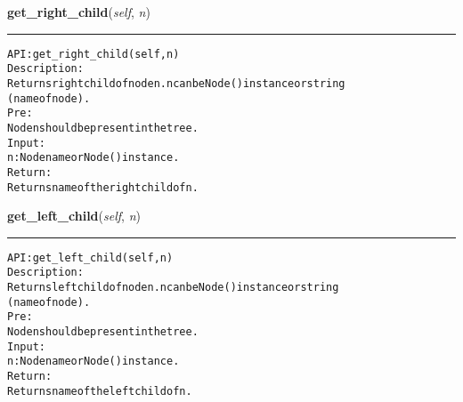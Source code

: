     \label{coinor:gimpy:tree:BinaryTree:get_right_child}

    \vspace{0.5ex}

\hspace{.8\funcindent}\begin{boxedminipage}{\funcwidth}

    \raggedright \textbf{get\_right\_child}(\textit{self}, \textit{n})

    \vspace{-1.5ex}

    \rule{\textwidth}{0.5\fboxrule}
\setlength{\parskip}{2ex}
\begin{alltt}

API: get\_right\_child(self, n)
Description:
    Returns right child of node n. n can be Node() instance or string
    (name of node).
Pre:
    Node n should be present in the tree.
Input:
    n: Node name or Node() instance.
Return:
    Returns name of the right child of n.
\end{alltt}

\setlength{\parskip}{1ex}
    \end{boxedminipage}

    \label{coinor:gimpy:tree:BinaryTree:get_left_child}

    \vspace{0.5ex}

\hspace{.8\funcindent}\begin{boxedminipage}{\funcwidth}

    \raggedright \textbf{get\_left\_child}(\textit{self}, \textit{n})

    \vspace{-1.5ex}

    \rule{\textwidth}{0.5\fboxrule}
\setlength{\parskip}{2ex}
\begin{alltt}

API: get\_left\_child(self, n)
Description:
    Returns left child of node n. n can be Node() instance or string
    (name of node).
Pre:
    Node n should be present in the tree.
Input:
    n: Node name or Node() instance.
Return:
    Returns name of the left child of n.
\end{alltt}

\setlength{\parskip}{1ex}
    \end{boxedminipage}

